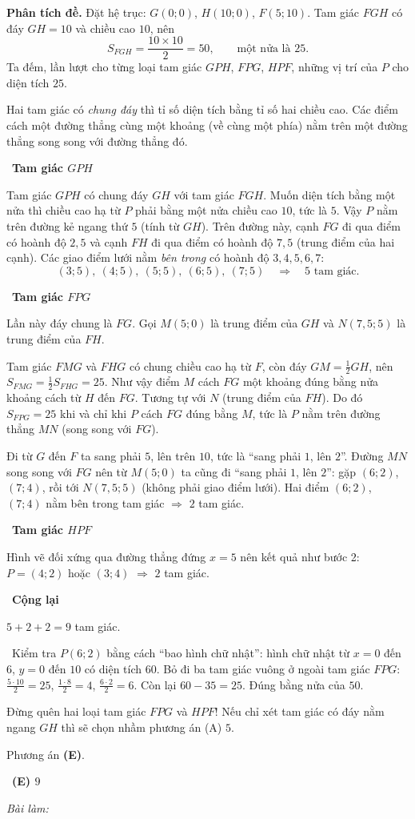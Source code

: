 \documentclass[11pt]{article}
\newif\ifsol \solfalse
\providecommand{\AnsWord}{Đáp số}
\newcommand{\ans}[1]{\par\smallskip{\bfseries\color{tmGreen!88!black}\AnsWord:}\ {\bfseries\color{AnsRed}#1}\par}
\newcommand{\probsol}[1]{%
  \begin{lrbox}{\solmeasure}\begin{minipage}{\dimexpr\linewidth-24pt\relax}#1\end{minipage}\end{lrbox}%
  \ifsol
    \begin{solbox}#1\end{solbox}%
  \else
    \setlength{\solht}{\dimexpr\ht\solmeasure+\dp\solmeasure+0.85cm\relax}%
    \ifdim\solht<1.35cm\setlength{\solht}{1.35cm}\fi
    \ifdim\solht>\StudentMaxWork\setlength{\solht}{\StudentMaxWork}\fi
    \begin{tcolorbox}[colback=white,colframe=Line,boxrule=0.8pt,arc=5pt,
      left=8pt,right=8pt,top=4pt,bottom=4pt,height=\solht]{\footnotesize\color{Slate}\itshape\WorkWord}\end{tcolorbox}%
  \fi}
\newlength{\StudentMaxWork}\setlength{\StudentMaxWork}{7.5cm}
\newcommand{\step}[2]{\par\smallskip\noindent{\bfseries\color{tmBlue!85!black}\StepWord~#1.}\ {\bfseries #2}\par\nopagebreak}
\newcommand{\verify}[1]{\par\smallskip\noindent{\bfseries\color{tmGreen!80!black}\faCheckCircle\ \CheckWord}\ #1\par}
\def\WorkWord{Bài làm:}
\def\AnsWord{Đáp số}
\def\StepWord{Bước}
\def\CheckWord{Thử lại:}
\begin{document}
\probsol{
\textbf{Phân tích đề.} Đặt hệ trục: $G(0;0)$, $H(10;0)$, $F(5;10)$. Tam giác $FGH$ có đáy $GH=10$ và chiều
cao $10$, nên
\[ S_{FGH}=\frac{10\times 10}{2}=50,\qquad \text{một nửa là } 25. \]
Ta đếm, lần lượt cho từng loại tam giác $GPH$, $FPG$, $HPF$, những vị trí của $P$ cho diện tích $25$.

\begin{recallbox}Hai tam giác có \emph{chung đáy} thì tỉ số diện tích bằng tỉ số hai chiều cao.
Các điểm cách một đường thẳng cùng một khoảng (về cùng một phía) nằm trên một đường thẳng song song
với đường thẳng đó.\end{recallbox}

\step{1}{Tam giác $GPH$}
Tam giác $GPH$ có chung đáy $GH$ với tam giác $FGH$. Muốn diện tích bằng một nửa thì chiều cao hạ từ $P$
phải bằng một nửa chiều cao $10$, tức là $5$. Vậy $P$ nằm trên đường kẻ ngang thứ $5$ (tính từ $GH$).
Trên đường này, cạnh $FG$ đi qua điểm có hoành độ $2{,}5$ và cạnh $FH$ đi qua điểm có hoành độ $7{,}5$
(trung điểm của hai cạnh). Các giao điểm lưới nằm \emph{bên trong} có hoành độ $3,4,5,6,7$:
\[ (3;5),\ (4;5),\ (5;5),\ (6;5),\ (7;5)\quad\Rightarrow\quad 5 \text{ tam giác.} \]

\step{2}{Tam giác $FPG$}
Lần này đáy chung là $FG$. Gọi $M(5;0)$ là trung điểm của $GH$ và $N(7{,}5;5)$ là trung điểm của $FH$.
\begin{proofbox}Tam giác $FMG$ và $FHG$ có chung chiều cao hạ từ $F$, còn đáy $GM=\tfrac12 GH$, nên
$S_{FMG}=\tfrac12 S_{FHG}=25$. Như vậy điểm $M$ cách $FG$ một khoảng đúng bằng nửa khoảng cách từ $H$
đến $FG$. Tương tự với $N$ (trung điểm của $FH$). Do đó $S_{FPG}=25$ khi và chỉ khi $P$ cách $FG$ đúng bằng
$M$, tức là $P$ nằm trên đường thẳng $MN$ (song song với $FG$).\end{proofbox}
Đi từ $G$ đến $F$ ta sang phải $5$, lên trên $10$, tức là ``sang phải $1$, lên $2$''. Đường $MN$ song song với
$FG$ nên từ $M(5;0)$ ta cũng đi ``sang phải $1$, lên $2$'': gặp $(6;2)$, $(7;4)$, rồi tới $N(7{,}5;5)$ (không
phải giao điểm lưới). Hai điểm $(6;2)$, $(7;4)$ nằm bên trong tam giác $\Rightarrow$ $2$ tam giác.

\step{3}{Tam giác $HPF$}
Hình vẽ đối xứng qua đường thẳng đứng $x=5$ nên kết quả như bước 2: $P=(4;2)$ hoặc $(3;4)$
$\Rightarrow$ $2$ tam giác.

\step{4}{Cộng lại}
$5+2+2=9$ tam giác.

\verify{Kiểm tra $P(6;2)$ bằng cách ``bao hình chữ nhật'': hình chữ nhật từ $x=0$ đến $6$, $y=0$ đến $10$ có
diện tích $60$. Bỏ đi ba tam giác vuông ở ngoài tam giác $FPG$: $\tfrac{5\cdot 10}{2}=25$, $\tfrac{1\cdot 8}{2}=4$,
$\tfrac{6\cdot 2}{2}=6$. Còn lại $60-35=25$. Đúng bằng nửa của $50$.}
\begin{warnbox}Đừng quên hai loại tam giác $FPG$ và $HPF$! Nếu chỉ xét tam giác có đáy nằm ngang $GH$
thì sẽ chọn nhầm phương án (A) $5$.\end{warnbox}
Phương án \textbf{(E)}.
\ans{(E) $9$}
}
\end{document}
